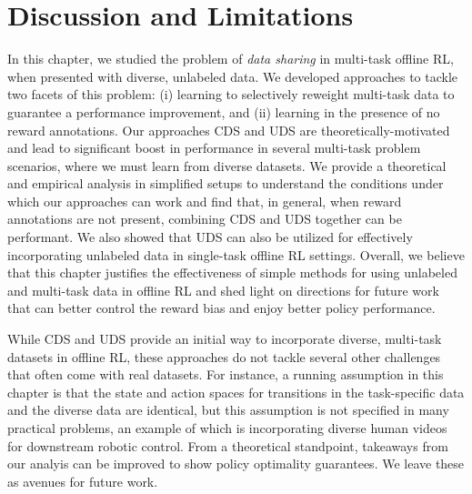\documentclass[../thesis.tex]{subfiles}
\begin{document}
    


% 




    
\vspace{-0.2cm}
\section{Discussion and Limitations}
\vspace{-0.2cm}

In this chapter, we studied the problem of \emph{data sharing} in multi-task offline RL, when presented with diverse, unlabeled data. We developed approaches to tackle two facets of this problem: (i) learning to selectively reweight multi-task data to guarantee a performance improvement, and (ii) learning in the presence of no reward annotations. Our approaches CDS and UDS are theoretically-motivated and lead to significant boost in performance in several multi-task problem scenarios, where we must learn from diverse datasets. We provide a theoretical and empirical analysis in simplified setups to understand the conditions under which our approaches can work and find that, in general, when reward annotations are not present, combining CDS and UDS together can be performant. We also showed that UDS can also be utilized for effectively incorporating unlabeled data in single-task offline RL settings. Overall, we believe that this chapter justifies the effectiveness of simple methods for using unlabeled and multi-task data in offline RL and shed light on directions for future work that can better control the reward bias and enjoy better policy performance.    

While CDS and UDS provide an initial way to incorporate diverse, multi-task datasets in offline RL, these approaches do not tackle several other challenges that often come with real datasets. For instance, a running assumption in this chapter is that the state and action spaces for transitions in the task-specific data and the diverse data are identical, but this assumption is not specified in many practical problems, an example of which is incorporating diverse human videos for downstream robotic control. From a theoretical standpoint, takeaways from our analyis can be improved to show policy optimality guarantees. We leave these as avenues for future work.       
\end{document}
